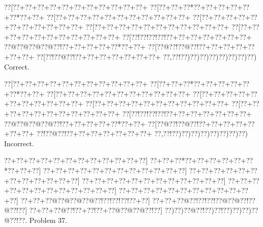 \documentclass[a5paper]{article}
\begin{document}
\begin{center}
{\goo
\0??[\0??+\0??+\0??+\0??+\0??+\0??+\0??+\0??+\0??+\0??+\0??+
\0??[\0??+\0??+\0??*\0??+\0??+\0??+\0??+\0??+\0??*\0??+\0??+
\0??[\0??+\0??+\0??+\0??+\0??+\0??+\0??+\0??+\0??+\0??+\0??+
\0??[\0??+\0??+\0??+\0??+\0??+\0??+\0??+\0??+\0??+\0??+\0??+
\0??[\0??+\0??+\0??+\0??+\0??+\0??+\0??+\0??+\0??+\0??+\0??+
\0??[\0??+\0??+\0??+\0??+\0??+\0??+\0??+\0??+\0??+\0??+\0??+
\0??[\0??!\0??!\0??!\0??!\0??+\0??+\0??+\0??+\0??+\0??+\0??+
\0??@\0??@\0??@\0??@\0??!\0??+\0??+\0??+\0??+\0??*\0??+\0??+
\0??[\0??@\0??!\0??@\0??!\0??+\0??+\0??+\0??+\0??+\0??+\0??+
\0??[\0??!\0??@\0??!\0??+\0??+\0??+\0??+\0??+\0??+\0??+
\0??,\0??!\0??)\0??)\0??)\0??)\0??)\0??)\0??)\0??)
}
Correct. 

\end{center}
\begin{center}
{\goo
\0??[\0??+\0??+\0??+\0??+\0??+\0??+\0??+\0??+\0??+\0??+\0??+
\0??[\0??+\0??+\0??*\0??+\0??+\0??+\0??+\0??+\0??*\0??+\0??+
\0??[\0??+\0??+\0??+\0??+\0??+\0??+\0??+\0??+\0??+\0??+\0??+
\0??[\0??+\0??+\0??+\0??+\0??+\0??+\0??+\0??+\0??+\0??+\0??+
\0??[\0??+\0??+\0??+\0??+\0??+\0??+\0??+\0??+\0??+\0??+\0??+
\0??[\0??+\0??+\0??+\0??+\0??+\0??+\0??+\0??+\0??+\0??+\0??+
\0??[\0??!\0??!\0??!\0??!\0??+\0??+\0??+\0??+\0??+\0??+\0??+
\0??@\0??@\0??@\0??@\0??!\0??+\0??+\0??+\0??+\0??*\0??+\0??+
\0??[\0??@\0??!\0??@\0??!\0??+\0??+\0??+\0??+\0??+\0??+\0??+
\0??!\0??@\0??!\0??+\0??+\0??+\0??+\0??+\0??+\0??+
\0??,\0??!\0??)\0??)\0??)\0??)\0??)\0??)\0??)\0??)
}
Incorrect. 

\end{center}
\newpage
\begin{center}
{\goo
\0??+\0??+\0??+\0??+\0??+\0??+\0??+\0??+\0??+\0??+\0??+\0??]
\0??+\0??+\0??*\0??+\0??+\0??+\0??+\0??+\0??*\0??+\0??+\0??]
\0??+\0??+\0??+\0??+\0??+\0??+\0??+\0??+\0??+\0??+\0??+\0??]
\0??+\0??+\0??+\0??+\0??+\0??+\0??+\0??+\0??+\0??+\0??+\0??]
\0??+\0??+\0??+\0??+\0??+\0??+\0??+\0??+\0??+\0??+\0??+\0??]
\0??+\0??+\0??+\0??+\0??+\0??+\0??+\0??+\0??+\0??+\0??+\0??]
\0??+\0??+\0??+\0??+\0??+\0??+\0??+\0??+\0??+\0??+\0??+\0??]
\0??+\0??+\0??@\0??@\0??@\0??@\0??!\0??!\0??!\0??!\0??+\0??]
\0??+\0??+\0??@\0??!\0??!\0??!\0??@\0??@\0??!\0??@\0??!\0??]
\0??+\0??+\0??@\0??!\0??+\0??!\0??+\0??@\0??@\0??@\0??!\0??]
\0??)\0??)\0??@\0??!\0??)\0??!\0??)\0??)\0??)\0??@\0??!\0??.
}
Problem 37.

\end{center}
\end{document}

